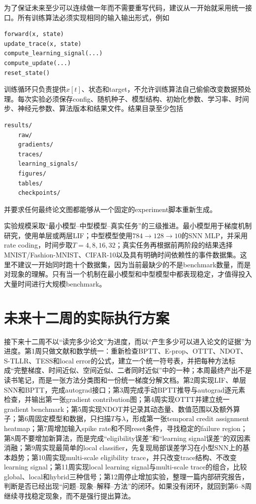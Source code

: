 \documentclass[journal,12pt,onecolumn]{IEEEtran}
\begin{document}
为了保证未来至少可以连续做一年而不需要重写代码，建议从一开始就采用统一接口。所有训练算法必须实现相同的输入输出形式，例如
\begin{verbatim}
forward(x, state)
update_trace(x, state)
compute_learning_signal(...)
compute_update(...)
reset_state()
\end{verbatim}
训练循环只负责提供$x[t]$、状态和target，不允许训练算法自己偷偷改变数据预处理。每次实验必须保存config、随机种子、模型结构、初始化参数、学习率、时间步、神经元参数、算法版本和结果文件。结果目录至少包括
\begin{verbatim}
results/
    raw/
    gradients/
    traces/
    learning_signals/
    figures/
    tables/
    checkpoints/
\end{verbatim}
并要求任何最终论文图都能够从一个固定的experiment脚本重新生成。

实验规模采取“最小模型--中型模型--真实任务”的三级推进。最小模型用于梯度机制研究，使用单层或两层LIF；中型模型使用$784\rightarrow128\rightarrow10$的SNN MLP，并采用rate coding，时间步取$T=4,8,16,32$；真实任务再根据前两阶段的结果选择MNIST/Fashion-MNIST、CIFAR-10以及具有明确时间依赖性的事件数据集。这里不建议一开始同时跑十个数据集，因为当前最缺少的不是benchmark数量，而是对现象的理解。只有当一个机制在最小模型和中型模型中都表现稳定，才值得投入大量时间进行大规模benchmark。

\section{未来十二周的实际执行方案}

接下来十二周不以“读完多少论文”为进度，而以“产生多少可以进入论文的证据”为进度。第1周只做文献和数学统一：重新检查BPTT、E-prop、OTTT、NDOT、S-TLLR、TESS和local error的公式，建立一个统一符号表，并把每种方法标成“完整梯度、时间近似、空间近似、二者同时近似”中的一种；本周最终产出不是读书笔记，而是一张方法分类图和一份统一梯度分解文档。第2周实现LIF、单层SNN和BPTT，完成autograd接口；第3周完成手动BPTT推导与autograd逐元素检查，并输出第一张gradient contribution图；第4周实现OTTT并建立统一gradient benchmark；第5周实现NDOT并记录其动态量、数值范围以及额外算子；第6周固定模型和数据，只扫描$T$与$\lambda$，形成第一张temporal credit assignment heatmap；第7周增加输入spike rate和不同reset条件，寻找稳定的failure region；第8周不要增加新算法，而是完成“eligibility误差”和“learning signal误差”的双因素消融；第9周实现最简单的local classifier，先复现局部误差学习在小型SNN上的基本趋势；第10周实现multi-scale eligibility trace，并只改变trace结构、不改变learning signal；第11周实现local learning signal与multi-scale trace的组合，比较global、local和hybrid三种信号；第12周停止增加实验，整理一篇内部研究报告，判断是否已经出现“问题--现象--解释--方法”的闭环。如果没有闭环，就回到第6--8周继续寻找稳定现象，而不是强行提出算法。
\end{document}
